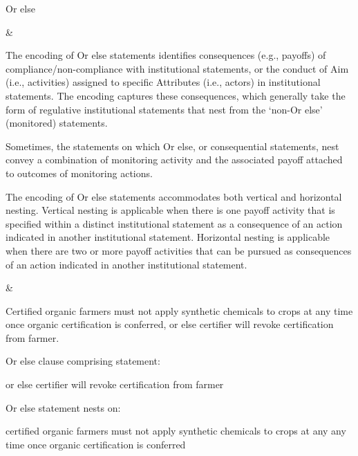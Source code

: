 \begin{landscape}
\begin{longtable}{\tabledims}
\newpage

\midrule

\begin{emp}Or else\end{emp} 

&

The encoding of Or else statements identifies consequences (e.g., payoffs) of compliance/non-compliance with institutional statements, or the conduct of Aim (i.e., activities) assigned to specific Attributes (i.e., actors) in institutional statements. The encoding captures these consequences, which generally  take the form of regulative institutional statements that nest from the ‘non-Or else’ (monitored)  statements.

\sp

Sometimes, the statements on which Or else, or consequential statements, nest convey a combination of  monitoring activity and the associated  payoff attached to outcomes of monitoring actions. 

\sp

The encoding of Or else statements accommodates both vertical and horizontal nesting. Vertical nesting is applicable when there is one payoff activity that is specified within a distinct institutional statement as a consequence of an action indicated in another institutional statement. Horizontal nesting is applicable when there are two or more payoff activities that can be pursued as consequences of an action indicated in another institutional statement. 

&


\begin{exi}Certified organic farmers must not apply synthetic chemicals to crops at any time once organic certification is conferred, or else certifier will revoke certification from farmer.\end{exi}

\sp

Or else clause comprising statement: \begin{exi}or else certifier will revoke certification from farmer\end{exi}

\sp

Or else statement nests on: \begin{exi}certified organic farmers must not apply synthetic chemicals to crops at any any time once organic certification is conferred\end{exi}


\end{longtable}
\end{landscape}
